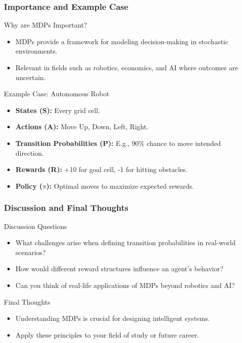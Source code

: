 \documentclass[aspectratio=169]{beamer}
\begin{document}
\begin{frame}[fragile]
    \frametitle{Importance and Example Case}
    \begin{block}{Why are MDPs Important?}
        \begin{itemize}
            \item MDPs provide a framework for modeling decision-making in stochastic environments.
            \item Relevant in fields such as robotics, economics, and AI where outcomes are uncertain.
        \end{itemize}
    \end{block}
    
    \begin{block}{Example Case: Autonomous Robot}
        \begin{itemize}
            \item \textbf{States (S):} Every grid cell.
            \item \textbf{Actions (A):} Move Up, Down, Left, Right.
            \item \textbf{Transition Probabilities (P):} E.g., 90\% chance to move intended direction.
            \item \textbf{Rewards (R):} +10 for goal cell, -1 for hitting obstacles.
            \item \textbf{Policy ($\pi$):} Optimal moves to maximize expected rewards.
        \end{itemize}
    \end{block}
\end{frame}

\begin{frame}[fragile]
    \frametitle{Discussion and Final Thoughts}
    \begin{block}{Discussion Questions}
        \begin{itemize}
            \item What challenges arise when defining transition probabilities in real-world scenarios?
            \item How would different reward structures influence an agent’s behavior?
            \item Can you think of real-life applications of MDPs beyond robotics and AI?
        \end{itemize}
    \end{block}
    
    \begin{block}{Final Thoughts}
        \begin{itemize}
            \item Understanding MDPs is crucial for designing intelligent systems.
            \item Apply these principles to your field of study or future career.
        \end{itemize}
    \end{block}
\end{frame}
\end{document}
